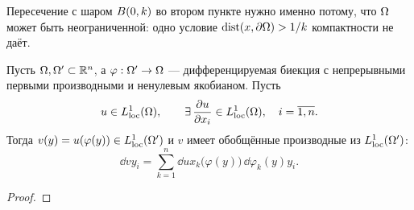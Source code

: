 \begin{idea}
Пересечение с шаром $B(0,k)$ во втором пункте нужно именно потому, что $\Omega$ может
быть неограниченной: одно условие $\operatorname{dist}(x,\partial\Omega) > 1/k$ компактности не даёт.
\end{idea}

\begin{theorem}\label{thm:change-vars}
Пусть $\Omega, \Omega' \subset \mathbb{R}^n$, а $\varphi : \Omega' \to \Omega$ — дифференцируемая биекция
с непрерывными первыми производными и ненулевым якобианом. Пусть
\[
  u \in L^1_{\mathrm{loc}}(\Omega), \qquad \exists\, \frac{\partial u}{\partial x_i} \in L^1_{\mathrm{loc}}(\Omega), \quad i = \overline{1,n} .
\]
Тогда $v(y) = u(\varphi(y)) \in L^1_{\mathrm{loc}}(\Omega')$ и $v$ имеет обобщённые производные
из $L^1_{\mathrm{loc}}(\Omega')$:
\[
  \dd{v}{y_i} = \sum_{k=1}^{n} \dd{u}{x_k}\big(\varphi(y)\big)\, \dd{\varphi_k(y)}{y_i} .
\]
\end{theorem}

\begin{proof}
\plusplus
\end{proof}
